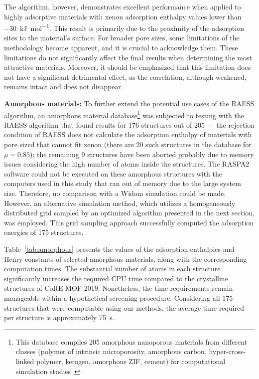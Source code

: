 \documentclass[main]{subfiles}
\begin{document}
The algorithm, however, demonstrates excellent performance when applied to highly adsorptive materials with xenon adsorption enthalpy values lower than \SI{-30}{\kilo\joule\per\mole}. This result is primarily due to the proximity of the adsorption sites to the material's surface. For broader pore sizes, some limitations of the methodology become apparent, and it is crucial to acknowledge them. These limitations do not significantly affect the final results when determining the most attractive materials. Moreover, it should be emphasized that this limitation does not have a significant detrimental effect, as the correlation, although weakened, remains intact and does not disappear.


\textbf{Amorphous materials:}
To further extend the potential use cases of the RAESS algorithm, an amorphous material database\footnote[1]{This database compiles 205 amorphous nanoporous materials from different classes (polymer of intrinsic microporosity, amorphous carbon, hyper-cross-linked polymer, kerogen, amorphous ZIF, cement) for computational simulation studies~\autocite{Thyagarajan_2020}} was subjected to testing with the RAESS algorithm that found results for 176 structures out of 205 --- the rejection condition of RAESS does not calculate the adsorption enthalpy of materials with pore sized that cannot fit xenon (there are 20 such structures in the database for $\mu=0.85$); the remaining 9 structures have been aborted probably due to memory issues considering the high number of atoms inside the structures. The RASPA2 software could not be executed on these amorphous structures with the computers used in this study that ran out of memory due to the large system size. Therefore, no comparison with a Widom simulation could be made. However, an alternative simulation method, which utilizes a homogeneously distributed grid sampled by an optimized algorithm presented in the next section, was employed. This grid sampling approach successfully computed the adsorption energies of 175 structures.

Table~\ref{tab:amorphous} presents the values of the adsorption enthalpies and Henry constants of selected amorphous materials, along with the corresponding computation times. The substantial number of atoms in each structure significantly increases the required CPU time compared to the crystalline structures of CoRE MOF 2019. Nonetheless, the time requirements remain manageable within a hypothetical screening procedure. Considering all 175 structures that were computable using our methods, the average time required per structure is approximately \SI{75}{\second}. 
\end{document}
